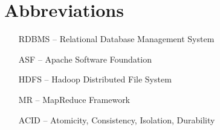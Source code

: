 \section*{Abbreviations}

\begin{itemize}[leftmargin=2cm, topsep=0pt, partopsep=5pt,itemsep=0pt,parsep=0pt]
\item[RDBMS --] Relational Database Management System
\item[ASF --] Apache Software Foundation 
\item [HDFS --] Hadoop Distributed File System
\item [MR --] MapReduce Framework
\item [ACID --] Atomicity, Consistency, Isolation, Durability



\end{itemize}